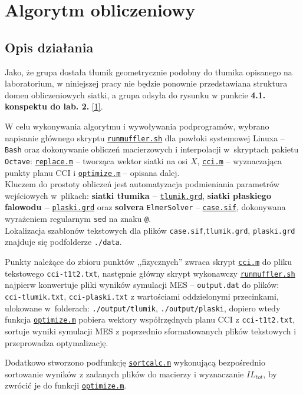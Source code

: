 \documentclass{sprawozdanie-agh}
\begin{document}
\section{Algorytm obliczeniowy}
\subsection{Opis działania}
Jako, że grupa dostała tłumik geometrycznie podobny do tłumika opisanego na laboratorium, w niniejszej pracy nie będzie ponownie przedstawiana struktura domen obliczeniowych siatki, a grupa odsyła do rysunku w punkcie \textbf{4.1. konspektu do lab. 2.} \hyperref[ref1]{[1]}.
\par W celu wykonywania algorytmu i wywoływania podprogramów, wybrano napisanie głównego skryptu \texttt{\hyperref[list1]{runmuffler.sh}} dla powłoki systemowej Linuxa -- \texttt{Bash} oraz dokonywanie obliczeń macierzowych i interpolacji w~skryptach pakietu \texttt{Octave}: \texttt{\hyperref[list5]{replace.m}} -- tworząca wektor siatki na osi $X$, \texttt{\hyperref[list7]{cci.m}} -- wyznaczająca punkty planu CCI i  \texttt{\hyperref[list6]{optimize.m}} -- opisana dalej.\\ Kluczem do prostoty obliczeń jest automatyzacja podmieniania parametrów wejściowych w~plikach: \textbf{siatki tłumika --} \texttt{\hyperref[list2]{tlumik.grd}}, \textbf{siatki płaskiego falowodu --} \texttt{\hyperref[list3]{plaski.grd}} oraz \textbf{solvera} \texttt{ElmerSolver} -- \texttt{\hyperref[list4]{case.sif}}, dokonywana wyrażeniem regularnym \texttt{\color{orange}sed} na znaku \texttt{\color{green}@}.\\
Lokalizacja szablonów tekstowych dla plików \texttt{case.sif},\texttt{tlumik.grd}, \texttt{plaski.grd} znajduje się podfolderze \texttt{./data}.
\par Punkty należące do zbioru punktów ,,fizycznych'' zwraca skrypt \hyperref[list7]{\texttt{cci.m}} do pliku tekstowego \texttt{cci-t1t2.txt}, następnie główny skrypt wykonawczy \texttt{\hyperref[list1]{runmuffler.sh}} najpierw konwertuje pliki wyników symulacji MES -- \texttt{output.dat} do plików:\\\texttt{cci-tlumik.txt}, \texttt{cci-plaski.txt} z wartościami oddzielonymi przecinkami,  ulokowane w~folderach: \texttt{./output/tlumik}, \texttt{./output/plaski}, dopiero wtedy funkcja \hyperref[list6]{\texttt{optimize.m}} pobiera wektory współrzędnych planu CCI z \texttt{cci-t1t2.txt}, sortuje wyniki symulacji MES z poprzednio sformatowanych plików tekstowych i przeprowadza optymalizację.
\par Dodatkowo stworzono podfunkcję \texttt{\hyperref[list8]{sortcalc.m}} wykonującą bezpośrednio sortowanie wyników z zadanych plików do macierzy i wyznaczanie $IL_{tot}$, by zwrócić je do funkcji \hyperref[list6]{\texttt{optimize.m}}.
\end{document}
